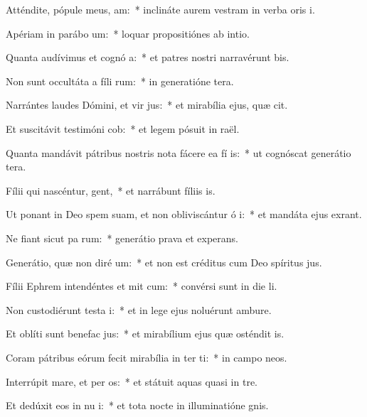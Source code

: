 \item Atténdite, pópule meus,  am:~* inclináte aurem vestram in verba oris i.
\item Apériam in parábo  um:~* loquar propositiónes ab intio.
\item Quanta audívimus et cognó a:~* et patres nostri narravérunt bis.
\item Non sunt occultáta a fíli rum:~* in generatióne tera.
\item Narrántes laudes Dómini, et vir jus:~* et mirabília ejus, quæ cit.
\item Et suscitávit testimóni  cob:~* et legem pósuit in raël.
\item Quanta mandávit pátribus nostris nota fácere ea fí is:~* ut cognóscat generátio tera.
\item Fílii qui nascéntur,  gent,~* et narrábunt fíliis is.
\item Ut ponant in Deo spem suam, et non obliviscántur ó i:~* et mandáta ejus exrant.
\item Ne fiant sicut pa rum:~* generátio prava et experans.
\item Generátio, quæ non diré  um:~* et non est créditus cum Deo spíritus jus.
\item Fílii Ephrem intendéntes et mit cum:~* convérsi sunt in die li.
\item Non custodiérunt testa i:~* et in lege ejus noluérunt ambure.
\item Et oblíti sunt benefac jus:~* et mirabílium ejus quæ osténdit is.
\item Coram pátribus eórum fecit mirabília in ter ti:~* in campo neos.
\item Interrúpit mare, et per os:~* et státuit aquas quasi in tre.
\item Et dedúxit eos in nu i:~* et tota nocte in illuminatióne gnis.
